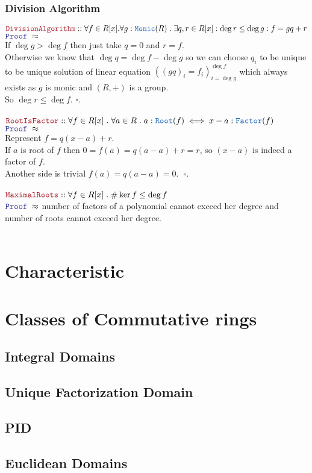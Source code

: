 \documentclass[12pt]{article}
\newcommand{\TYPE}[1]{\textcolor{NavyBlue}{\mathtt{#1}}}
\newcommand{\LOGIC}[1]{\textcolor{Blue}{\mathtt{#1}}}
\newcommand{\THM}[1]{\textcolor{Maroon}{\mathtt{#1}}}
\renewcommand{\.}{\; . \;}
\newcommand{\QED}{\; \square}
\newcommand{\Proof}{\LOGIC{Proof} \; }
\begin{document}
\subsubsection{Division Algorithm}
$
\THM{DivisionAlgorithm} :: \forall f \in R[x] . \forall g : \TYPE{Monic}(R) \.    
\exists q,r \in R[x] : \deg r \le \deg g : f = gq + r
$ \\
$\Proof \approx $ \\
If $\deg g > \deg f$ then just take $q = 0 $ and $r = f$. \\
Otherwise we know that $\deg q =  \deg f - \deg g$ so we can choose   $q_i$ to be unique to be unique solution of linear equation $( (gq)_i = f_i )^{\deg f}_{i = \deg g }$ which always exists as $g$ is monic and $(R,+)$ is a group. \\
So $\deg r \le \deg f $. $\square$. 
\\ \\
$
\THM{RootIsFactor} :: \forall f \in R[x] \. \forall a \in R \. a : \TYPE{Root}(f) \iff x -a : \TYPE{Factor}(f)
$ \\
$\Proof \approx  $ \\    
 Represent $f = q(x - a) + r$. \\
 If $a$ is root of $f$ then $0 = f(a) = q(a - a) + r = r$, so $(x - a)$ is indeed a factor of $f$.  \\
 Another side is trivial $f(a) = q(a - a) = 0$. $\QED$.   
 \\ \\
 $
\THM{MaximalRoots} :: \forall f \in R[x] \.  \#\ker f \le \deg f 
$ \\
$\Proof \approx$
 number of factors of a polynomial cannot exceed her degree and number of roots cannot exceed her degree.
 \\ \\
 
\newpage
\section{Characteristic}
\section{Classes of Commutative rings}
\subsection{Integral Domains}
\subsection{Unique Factorization Domain}
\subsection{PID}
\subsection{Euclidean Domains}
\end{document}

